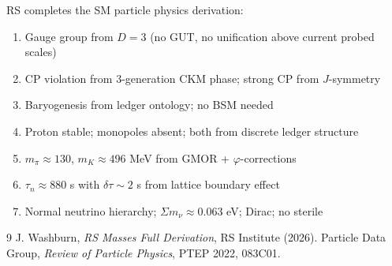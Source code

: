 \documentclass[12pt,a4paper]{article}
\theoremstyle{definition}
\theoremstyle{remark}
\begin{document}
RS completes the SM particle physics derivation:
\begin{enumerate}
\item Gauge group from $D = 3$ (no GUT, no unification above current probed scales)
\item CP violation from 3-generation CKM phase; strong CP from $J$-symmetry
\item Baryogenesis from ledger ontology; no BSM needed
\item Proton stable; monopoles absent; both from discrete ledger structure
\item $m_\pi \approx 130$, $m_K \approx 496$ MeV from GMOR + $\varphi$-corrections
\item $\tau_n \approx 880$ s with $\delta\tau \sim 2$ s from lattice boundary effect
\item Normal neutrino hierarchy; $\Sigma m_\nu \approx 0.063$ eV; Dirac; no sterile
\end{enumerate}

\begin{thebibliography}{9}
 J. Washburn, \emph{RS Masses Full Derivation}, RS Institute (2026).
 Particle Data Group, \emph{Review of Particle Physics}, PTEP 2022, 083C01.
\end{thebibliography}
\end{document}
